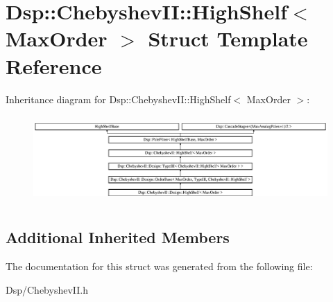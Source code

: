 \hypertarget{structDsp_1_1ChebyshevII_1_1HighShelf}{\section{Dsp\-:\-:Chebyshev\-I\-I\-:\-:High\-Shelf$<$ Max\-Order $>$ Struct Template Reference}
\label{structDsp_1_1ChebyshevII_1_1HighShelf}
}
Inheritance diagram for Dsp\-:\-:Chebyshev\-I\-I\-:\-:High\-Shelf$<$ Max\-Order $>$\-:\begin{figure}[H]
\begin{center}
\leavevmode
\includegraphics[height=3.366734cm]{structDsp_1_1ChebyshevII_1_1HighShelf}
\end{center}
\end{figure}
\subsection*{Additional Inherited Members}


The documentation for this struct was generated from the following file\-:\begin{DoxyCompactItemize}
\item 
Dsp/Chebyshev\-I\-I.\-h\end{DoxyCompactItemize}
